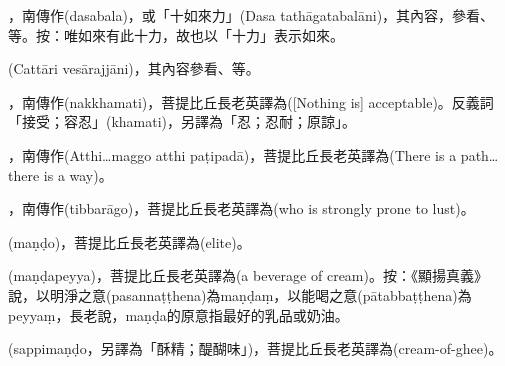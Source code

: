 \startitemgroup[noteitems]
\item{}，南傳作(dasabala)，或「十如來力」(Dasa tathāgatabalāni)，其內容，參看、等。按：唯如來有此十力，故也以「十力」表示如來。
\item{}(Cattāri vesārajjāni)，其內容參看、等。
\stopitemgroup

\startitemgroup[noteitems]
\item{}，南傳作(nakkhamati)，菩提比丘長老英譯為([Nothing is] acceptable)。反義詞「接受；容忍」(khamati)，另譯為「忍；忍耐；原諒」。
\stopitemgroup

\startitemgroup[noteitems]
\item{}，南傳作(Atthi…maggo atthi paṭipadā)，菩提比丘長老英譯為(There is a path…there is a way)。
\stopitemgroup

\startitemgroup[noteitems]
\item{}，南傳作(tibbarāgo)，菩提比丘長老英譯為(who is strongly prone to lust)。
\stopitemgroup

\startitemgroup[noteitems]
\item{}(maṇḍo)，菩提比丘長老英譯為(elite)。
\item{}(maṇḍapeyya)，菩提比丘長老英譯為(a beverage of cream)。按：《顯揚真義》說，以明淨之意(pasannaṭṭhena)為maṇḍaṃ，以能喝之意(pātabbaṭṭhena)為peyyaṃ，長老說，maṇḍa的原意指最好的乳品或奶油。
\item{}(sappimaṇḍo，另譯為「酥精；醍醐味」)，菩提比丘長老英譯為(cream-of-ghee)。
\stopitemgroup

